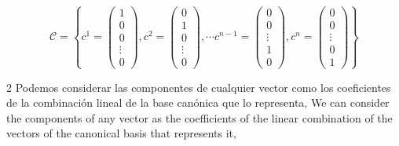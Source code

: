 \begin{equation*}
\mathcal{C}=\left\lbrace c^1=\begin{pmatrix}
1\\
0\\
0\\
\vdots \\
0
\end{pmatrix}, c^2=\begin{pmatrix}
0\\
1\\
0\\
\vdots \\
0
\end{pmatrix},
\cdots
c^{n-1}=\begin{pmatrix}
0\\
0\\
\vdots \\
1\\
0
\end{pmatrix},
c^n=\begin{pmatrix}
0\\
0\\
\vdots \\
0\\
1
\end{pmatrix} \right\rbrace
\end{equation*} 
\begin{paracol}{2}
Podemos considerar las componentes de cualquier vector como los coeficientes de la combinación lineal de la base canónica que lo representa,
\switchcolumn
We can consider the components of any vector as the coefficients of the linear combination of the vectors of the canonical basis that represents it,
\end{paracol}
